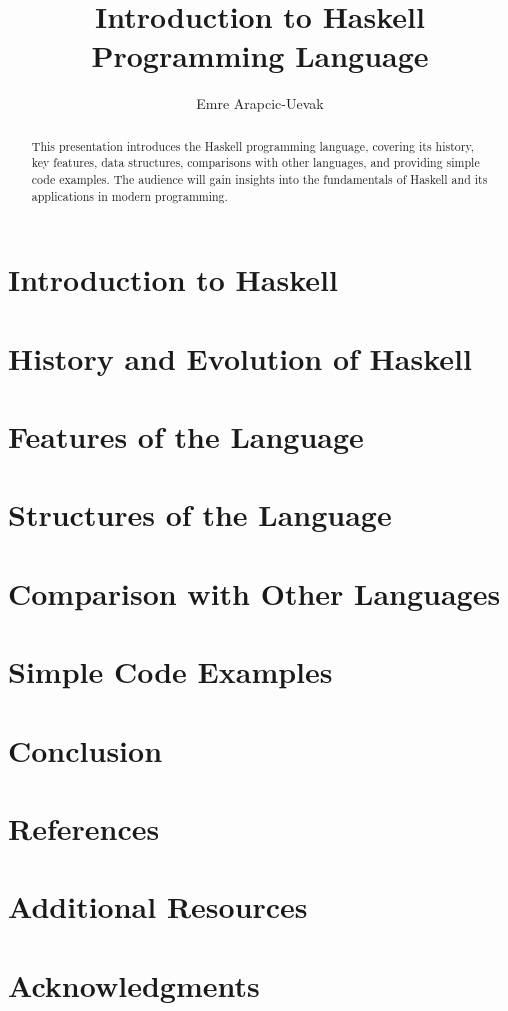 \documentclass[a4paper, 10pt]{article}
\title{Introduction to Haskell Programming Language}
\author{Emre Arapcic-Uevak}
\date{}
\begin{document}
	\maketitle
	\vspace{5mm}
	
	\begin{abstract}
		\begin{center}
			This presentation introduces the Haskell programming language, covering its history, key features, data structures, comparisons with other languages, and providing simple code examples. The audience will gain insights into the fundamentals of Haskell and its applications in modern programming.
		\end{center}
	\end{abstract}


	\pagebreak
	\tableofcontents
	\pagebreak

	\section{Introduction to Haskell}
	\section{History and Evolution of Haskell}
	\section{Features of the Language}
	\section{Structures of the Language}
	\section{Comparison with Other Languages}
	\section{Simple Code Examples}
	\section{Conclusion}
	\section{References}
	\section{Additional Resources}
	\section{Acknowledgments}
\end{document}
